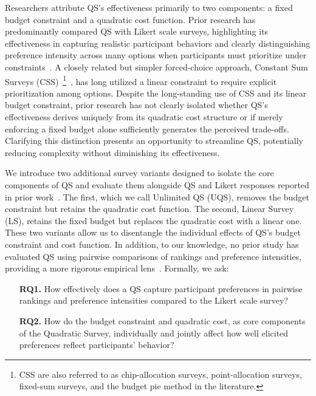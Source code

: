 Researchers attribute QS's effectiveness primarily to two components: a fixed budget constraint and a quadratic cost function. Prior research has predominantly compared QS with Likert scale surveys, highlighting its effectiveness in capturing realistic participant behaviors and clearly distinguishing preference intensity across many options when participants must prioritize under constraints~\cite{chengCanShowWhat2021, cavaille2024cares}. A closely related but simpler forced-choice approach, Constant Sum Surveys (CSS)~\footnote{CSS are also referred to as chip-allocation surveys, point-allocation surveys, fixed-sum surveys, and the budget pie method in the literature.}~\cite{metfesselProposalQuantitativeReporting1947}, has long utilized a linear constraint to require explicit prioritization among options. Despite the long-standing use of CSS and its linear budget constraint, prior research has not clearly isolated whether QS's effectiveness derives uniquely from its quadratic cost structure or if merely enforcing a fixed budget alone sufficiently generates the perceived trade-offs. Clarifying this distinction presents an opportunity to streamline QS, potentially reducing complexity without diminishing its effectiveness.


We introduce two additional survey variants designed to isolate the core components of QS and evaluate them alongside QS and Likert responses reported in prior work~\cite{chengCanShowWhat2021}. The first, which we call Unlimited QS (UQS), removes the budget constraint but retains the quadratic cost function. The second, Linear Survey (LS), retains the fixed budget but replaces the quadratic cost with a linear one. These two variants allow us to disentangle the individual effects of QS's budget constraint and cost function. In addition, to our knowledge, no prior study has evaluated QS using pairwise comparisons of rankings and preference intensities, providing a more rigorous empirical lens~\cite{collewet2023preference}. Formally, we ask:

\begin{itemize}
    \item [\textbf{RQ1.}] How effectively does a QS capture participant preferences in pairwise rankings and preference intensities compared to the Likert scale survey?
    \item [\textbf{RQ2.}] How do the budget constraint and quadratic cost, as core components of the Quadratic Survey, individually and jointly affect how well elicited preferences reflect participants' behavior?
\end{itemize}

